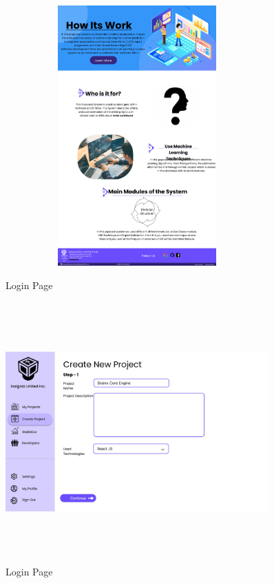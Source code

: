\begin{figure}[H]
\includegraphics[height=10cm, width=0.9\textwidth]{./images/prototype/0009}
\centering 
\caption{Login Page}
\label{fig:prototype1}

\includegraphics[height=10cm, width=0.9\textwidth]{./images/prototype/0010}
\centering 
\caption{Login Page}
\label{fig:prototype1}
\end{figure}

